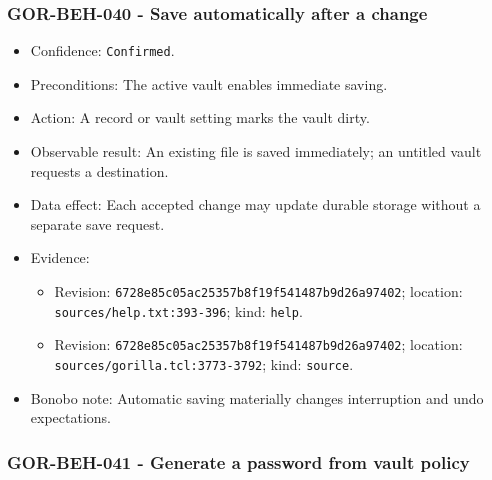 \documentclass[
  letterpaper,
]{article}
\newcommand{\passthrough}[1]{#1}
\providecommand{\tightlist}{%
  \setlength{\itemsep}{0pt}\setlength{\parskip}{0pt}}
\begin{document}
\subsubsection{GOR-BEH-040 - Save automatically after a change}\label{gor-beh-040---save-automatically-after-a-change}

\begin{itemize}
\tightlist
\item
  Confidence: \passthrough{\lstinline!Confirmed!}.
\item
  Preconditions: The active vault enables immediate saving.
\item
  Action: A record or vault setting marks the vault dirty.
\item
  Observable result: An existing file is saved immediately; an untitled vault requests a destination.
\item
  Data effect: Each accepted change may update durable storage without a separate save request.
\item
  Evidence:

  \begin{itemize}
  \tightlist
  \item
    Revision: \nolinkurl{6728e85c05ac25357b8f19f541487b9d26a97402}; location: \nolinkurl{sources/help.txt:393-396};
    kind: \passthrough{\lstinline!help!}.
  \item
    Revision: \nolinkurl{6728e85c05ac25357b8f19f541487b9d26a97402}; location: \nolinkurl{sources/gorilla.tcl:3773-3792};
    kind: \passthrough{\lstinline!source!}.
  \end{itemize}
\item
  Bonobo note: Automatic saving materially changes interruption and undo expectations.
\end{itemize}

\subsubsection{GOR-BEH-041 - Generate a password from vault
policy}\label{gor-beh-041---generate-a-password-from-vault-policy}
\end{document}
